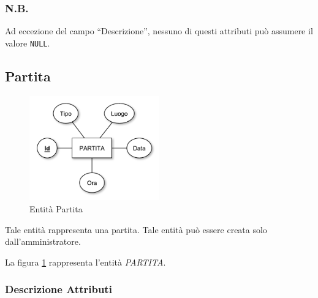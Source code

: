 		\subsubsection*{N.B.}
		Ad eccezione del campo ``Descrizione'', nessuno di questi attributi può assumere il valore \texttt{NULL}.
	
	\subsection{Partita}
		
		\begin{figure}[h]
			\centering
			\includegraphics[width=0.5\textwidth]
			{immagini/07-partita}
			
			\caption{Entità Partita}
			\label{entita-partita}
		\end{figure}
		
		Tale entità rappresenta una partita. Tale entità può essere creata solo dall'amministratore.
		
		La figura \ref{entita-partita} rappresenta l'entità \emph{PARTITA}.
		
		\subsubsection*{Descrizione Attributi}
		
